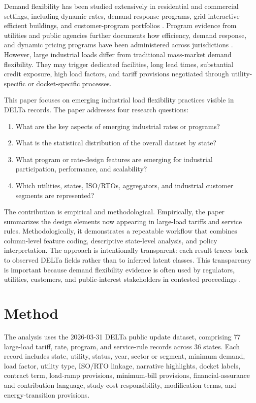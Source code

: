 \documentclass[11pt]{article}
\begin{document}
Demand flexibility has been studied extensively in residential and commercial settings, including dynamic rates, demand-response programs, grid-interactive efficient buildings, and customer-program portfolios \cite{lbnl_dfpr2024,goldenberg2018,satchwell2021,hledik2019,frick2021,stoll2017,zhoumai2021,hale2016}. Program evidence from utilities and public agencies further documents how efficiency, demand response, and dynamic pricing programs have been administered across jurisdictions \cite{aps2022,austin2022,entergy2022,pepco2018,pepco2022,smeco2022,xcel2022,cec2022,eia861,eiarecs2023,ferc2022,hronis2020}. However, large industrial loads differ from traditional mass-market demand flexibility. They may trigger dedicated facilities, long lead times, substantial credit exposure, high load factors, and tariff provisions negotiated through utility-specific or docket-specific processes.

This paper focuses on emerging industrial load flexibility practices visible in DELTa records. The paper addresses four research questions:
\begin{enumerate}
    \item What are the key aspects of emerging industrial rates or programs?
    \item What is the statistical distribution of the overall dataset by state?
    \item What program or rate-design features are emerging for industrial participation, performance, and scalability?
    \item Which utilities, states, ISO/RTOs, aggregators, and industrial customer segments are represented?
\end{enumerate}

The contribution is empirical and methodological. Empirically, the paper summarizes the design elements now appearing in large-load tariffs and service rules. Methodologically, it demonstrates a repeatable workflow that combines column-level feature coding, descriptive state-level analysis, and policy interpretation. The approach is intentionally transparent: each result traces back to observed DELTa fields rather than to inferred latent classes. This transparency is important because demand flexibility evidence is often used by regulators, utilities, customers, and public-interest stakeholders in contested proceedings \cite{lbnl_dfpr2024,ferc2022,hledik2019,satchwell2021}.

\section{Method}
The analysis uses the 2026-03-31 DELTa public update dataset, comprising 77 large-load tariff, rate, program, and service-rule records across 36 states. Each record includes state, utility, status, year, sector or segment, minimum demand, load factor, utility type, ISO/RTO linkage, narrative highlights, docket labels, contract term, load-ramp provisions, minimum-bill provisions, financial-assurance and contribution language, study-cost responsibility, modification terms, and energy-transition provisions.
\end{document}
